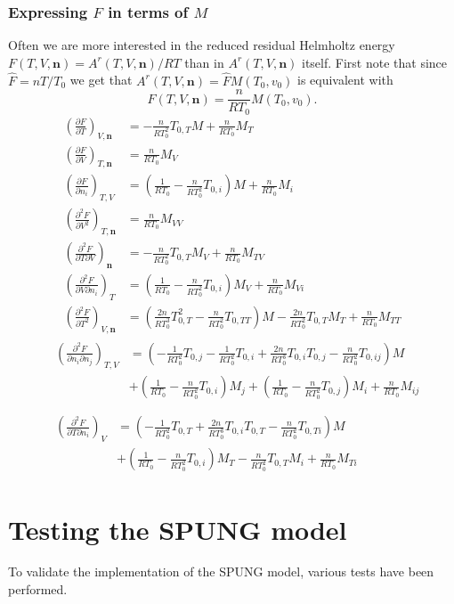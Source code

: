 \documentclass[english]{../thermomemo/thermomemo}
\newcommand{\mbn}[0]{\mathbf n}
\newcommand*{\pdersub}[3]{\left(\frac{\partial #1}{\partial #2}\right)_{#3}}
\newcommand*{\pddersub}[3]{\left(\frac{\partial^2 #1}{\partial #2^2}\right)_{#3}}
\newcommand*{\pdcrosssub}[4]{\left(\frac{\partial^2 #1}{\partial #2 \partial #3}\right)_{#4}}
\newcommand*{\hF}[0]{\hat F}
\newcommand{\lp}{\left(}
\newcommand{\rp}{\right)}
\numberwithin{equation}{section}
\begin{document}
\subsubsection*{Expressing $F$ in terms of $M$}
Often we are more interested in the reduced residual Helmholtz energy
$F(T,V,\mbn) = A^r(T,V,\mbn)/RT$ than in $A^r(T,V,\mbn)$ itself. First
note that since $\hF = nT/T_0$ we get that $A^r(T,V,\mbn) = \hF
M(T_0,v_0)$ is equivalent with
$$
F(T,V,\mbn) = \frac{n}{RT_0} M(T_0,v_0).
$$
\begin{align}
  \pdersub{F}{T}{V,\mbn} &= -\frac{n}{RT_0^2} T_{0,T} M +\frac{n}{RT_0} M_T \\
  \pdersub{F}{V}{T,\mbn} &= \frac{n}{RT_0} M_V \\
  \pdersub{F}{n_i}{T,V} &= \lp \frac{1}{RT_0} - \frac{n}{RT_0^2} T_{0,i} \rp M + \frac{n}{RT_0} M_i \\
  \pddersub{F}{V}{T,\mbn} &= \frac{n}{RT_0} M_{VV} \\
  \pdcrosssub{F}{T}{V}{\mbn} &= -\frac{n}{RT_0^2} T_{0,T} M_V +\frac{n}{RT_0} M_{TV} \\
  \pdcrosssub{F}{V}{n_i}{T} &= \lp \frac{1}{RT_0} - \frac{n}{RT_0^2} T_{0,i} \rp M_V + \frac{n}{RT_0} M_{Vi} \\
  \pddersub{F}{T}{V,\mbn} &= \lp \frac{2n}{RT_0^3} T_{0,T}^2 -
  \frac{n}{RT_0^2} T_{0,TT} \rp M - \frac{2n}{RT_0^2} T_{0,T} M_T +
  \frac{n}{RT_0} M_{TT}
\end{align}
\begin{align}
  &\begin{aligned}
    \pdcrosssub{F}{n_i}{n_j}{T,V} &= \lp -\frac{1}{RT_0^2} T_{0,j} - \frac{1}{RT_0^2} T_{0,i} + \frac{2n}{RT_0^3} T_{0,i} T_{0,j} - \frac{n}{RT_0^2} T_{0,ij} \rp M \\
    &+ \lp \frac{1}{RT_0} - \frac{n}{RT_0^2} T_{0,i} \rp M_j + \lp \frac{1}{RT_0} - \frac{n}{RT_0^2} T_{0,j} \rp M_i + \frac{n}{RT_0} M_{ij} \\
  \end{aligned} \\
  &\begin{aligned}
    \pdcrosssub{F}{T}{n_i}{V} &= \lp -\frac{1}{RT_0^2} T_{0,T} + \frac{2n}{RT_0^3} T_{0,i} T_{0,T} - \frac{n}{RT_0^2} T_{0,Ti} \rp M \\
    &+ \lp \frac{1}{RT_0} - \frac{n}{RT_0^2} T_{0,i} \rp M_T -
    \frac{n}{RT_0^2} T_{0,T} M_i + \frac{n}{RT_0} M_{Ti}
  \end{aligned}
\end{align}

\section{Testing the SPUNG model}
To validate the implementation of the SPUNG model, various tests have
been performed.
\end{document}
